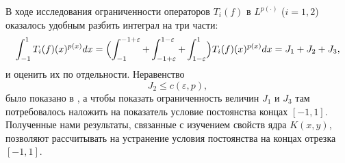 В ходе исследования ограниченности операторов $T_i(f)$ в $L^{p(\cdot)}$ ($i=1,2$) оказалось удобным разбить интеграл на три части:
\begin{equation*}
\int_{-1}^1 T_i(f)(x)^{p(x)}dx=\Bigl(\int_{-1}^{-1+\varepsilon} + \int_{-1+\varepsilon}^{1-\varepsilon} + \int_{1-\varepsilon}^{1}\Bigr)T_i(f)(x)^{p(x)}dx=J_1+J_2+J_3,
\end{equation*}
и оценить их по отдельности. Неравенство
$$
J_2\le c(\varepsilon,p),
$$
было показано в \cite{tad-SHII-Leg}, а чтобы показать ограниченность величин $J_1$ и $J_3$ там потребовалось наложить на показатель условие постоянства концах $[-1,1]$. Полученные нами результаты, связанные с изучением свойств ядра $K(x,y)$, позволяют рассчитывать на устранение условия постоянства на концах отрезка $[-1,1]$.

